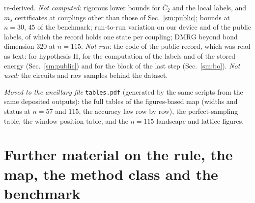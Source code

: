 \documentclass[aps,prx,onecolumn,10pt,nofootinbib,longbibliography,floatfix]{revtex4-2}
\theoremstyle{remark}
\newcommand{\ms}{m_s}
\newcommand{\Ctwo}{\bar C_{2}}
\begin{document}
re-derived. \emph{Not computed:} rigorous lower bounds for $\Ctwo$ and the local labels, and $\ms$ certificates at
couplings other than those of Sec.~\ref{sm:public}; bounds at $n=30$, $45$ of the %
benchmark; run-to-run variation on our device and of the public labels, of which the record holds one state per
coupling; DMRG beyond bond dimension $320$ at $n=115$. \emph{Not run:} the code of the public record, which was %
read as text: for hypothesis H, for the computation of the labels and of the stored energy (Sec.~\ref{sm:public})
and for the block of the last step (Sec.~\ref{sm:bo}). \emph{Not used:} the circuits and raw samples behind the
dataset.

\emph{Moved to the ancillary file} \texttt{tables.pdf} (generated by the same scripts from the same deposited
outputs): the full tables of the figures-based map (widths and status at $n=57$ and $115$, the accuracy law row by row), the %
perfect-sampling table, the window-position table, and the $n=115$ landscape and lattice figures. %

\section{Further material on the rule, the map, the method class and the benchmark}
\label{sm:moved}
\end{document}

